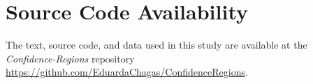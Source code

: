 \section{Source Code Availability}\label{Sec:code}

The text, source code, and data used in this study are available at the \textit{Confidence-Regions} repository \url{https://github.com/EduardaChagas/ConfidenceRegions}.


